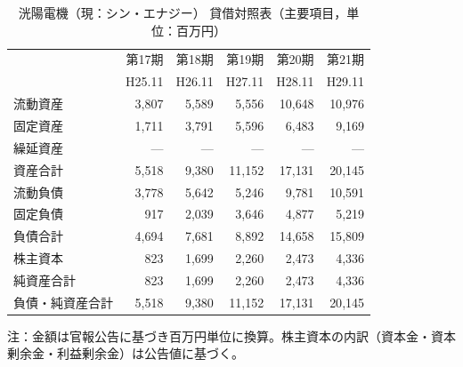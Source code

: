 \begin{table}[H]
\centering
\caption{洸陽電機（現：シン・エナジー） 貸借対照表（主要項目，単位：百万円）}
\begin{tabular}{lrrrrr}
\toprule
 & 第17期 & 第18期 & 第19期 & 第20期 & 第21期 \\
 & H25.11 & H26.11 & H27.11 & H28.11 & H29.11 \\
\midrule
流動資産       & 3{,}807 & 5{,}589 & 5{,}556 & 10{,}648 & 10{,}976 \\
固定資産       & 1{,}711 & 3{,}791 & 5{,}596 & 6{,}483 & 9{,}169 \\
繰延資産       & —       & —       & —       & —       & — \\
\midrule
資産合計       & 5{,}518 & 9{,}380 & 11{,}152 & 17{,}131 & 20{,}145 \\
\midrule
流動負債       & 3{,}778 & 5{,}642 & 5{,}246 & 9{,}781 & 10{,}591 \\
固定負債       & 917     & 2{,}039 & 3{,}646 & 4{,}877 & 5{,}219 \\
負債合計       & 4{,}694 & 7{,}681 & 8{,}892 & 14{,}658 & 15{,}809 \\
\midrule
株主資本       & 823     & 1{,}699 & 2{,}260 & 2{,}473 & 4{,}336 \\
純資産合計     & 823     & 1{,}699 & 2{,}260 & 2{,}473 & 4{,}336 \\
\midrule
負債・純資産合計 & 5{,}518 & 9{,}380 & 11{,}152 & 17{,}131 & 20{,}145 \\
\bottomrule
\end{tabular}
\end{table}

\begin{flushleft}
\footnotesize
注：金額は官報公告に基づき百万円単位に換算。株主資本の内訳（資本金・資本剰余金・利益剰余金）は公告値に基づく。
\end{flushleft}

